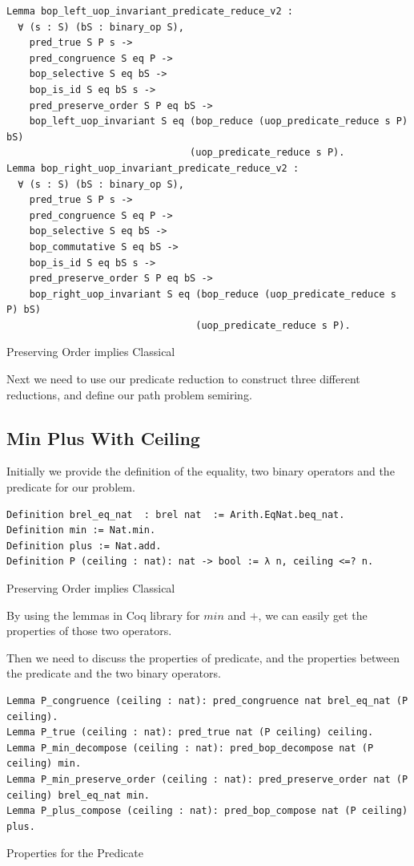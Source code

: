 \documentclass[a4paper,12pt,twoside,openright]{report}
\begin{document}
\begin{listing}[H]
\begin{verbatim}
Lemma bop_left_uop_invariant_predicate_reduce_v2 :
  ∀ (s : S) (bS : binary_op S),
    pred_true S P s ->
    pred_congruence S eq P -> 
    bop_selective S eq bS ->
    bop_is_id S eq bS s ->        
    pred_preserve_order S P eq bS ->
    bop_left_uop_invariant S eq (bop_reduce (uop_predicate_reduce s P) bS) 
                                (uop_predicate_reduce s P).
Lemma bop_right_uop_invariant_predicate_reduce_v2 :
  ∀ (s : S) (bS : binary_op S),
    pred_true S P s ->
    pred_congruence S eq P -> 
    bop_selective S eq bS ->
    bop_commutative S eq bS ->
    bop_is_id S eq bS s ->        
    pred_preserve_order S P eq bS ->
    bop_right_uop_invariant S eq (bop_reduce (uop_predicate_reduce s P) bS) 
                                 (uop_predicate_reduce s P).
\end{verbatim}
\caption{Preserving Order implies Classical} 
\label{coq:proof:preserve_order_classic}
\end{listing}
Next we need to use our predicate reduction to construct three different reductions, and define our path problem semiring.
\subsection{Min Plus With Ceiling}
Initially we provide the definition of the equality, two binary operators and the predicate for our problem.
\begin{listing}[H]
\begin{verbatim}
Definition brel_eq_nat  : brel nat  := Arith.EqNat.beq_nat.
Definition min := Nat.min.
Definition plus := Nat.add.
Definition P (ceiling : nat): nat -> bool := λ n, ceiling <=? n.
\end{verbatim}
\caption{Preserving Order implies Classical} 
\label{coq:def:min_plus_with_ceiling}
\end{listing}

By using the lemmas in Coq library for $min$ and $+$, we can easily get the properties of those two operators.

Then we need to discuss the properties of predicate, and the properties between the predicate and the two binary operators.
\begin{listing}[H]
\begin{verbatim}
Lemma P_congruence (ceiling : nat): pred_congruence nat brel_eq_nat (P ceiling).
Lemma P_true (ceiling : nat): pred_true nat (P ceiling) ceiling.
Lemma P_min_decompose (ceiling : nat): pred_bop_decompose nat (P ceiling) min.
Lemma P_min_preserve_order (ceiling : nat): pred_preserve_order nat (P ceiling) brel_eq_nat min.
Lemma P_plus_compose (ceiling : nat): pred_bop_compose nat (P ceiling) plus.
\end{verbatim}
\caption{Properties for the Predicate} 
\label{coq:proof:predicate_properties}
\end{listing}
\end{document}
